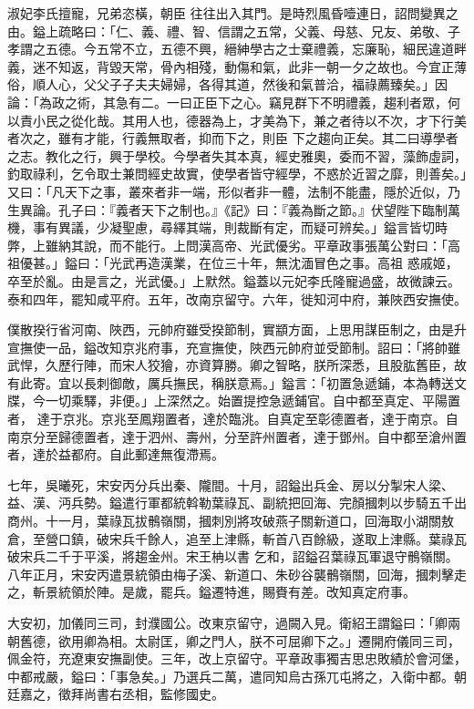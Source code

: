 \begin{pinyinscope}
 淑妃李氏擅寵，兄弟恣橫，朝臣
 往往出入其門。是時烈風昏噎連日，詔問變異之由。鎰上疏略曰：「仁、義、禮、智、信謂之五常，父義、母慈、兄友、弟敬、子孝謂之五德。今五常不立，五德不興，縉紳學古之士棄禮義，忘廉恥，細民違道畔義，迷不知返，背毀天常，骨內相殘，動傷和氣，此非一朝一夕之故也。今宜正薄俗，順人心，父父子子夫夫婦婦，各得其道，然後和氣普洽，福祿薦臻矣。」因論：「為政之術，其急有二。一曰正臣下之心。竊見群下不明禮義，趨利者眾，何以責小民之從化哉。其用人也，德器為上，才美為下，兼之者待以不次，才下行美者次之，雖有才能，行義無取者，抑而下之，則臣
 下之趨向正矣。其二曰導學者之志。教化之行，興于學校。今學者失其本真，經史雅奧，委而不習，藻飾虛詞，釣取祿利，乞令取士兼問經史故實，使學者皆守經學，不惑於近習之靡，則善矣。」又曰：「凡天下之事，叢來者非一端，形似者非一體，法制不能盡，隱於近似，乃生異論。孔子曰：『義者天下之制也。』《記》曰：『義為斷之節。』伏望陛下臨制萬機，事有異議，少凝聖慮，尋繹其端，則裁斷有定，而疑可辨矣。」鎰言皆切時弊，上雖納其說，而不能行。上問漢高帝、光武優劣。平章政事張萬公對曰：「高祖優甚。」鎰曰：「光武再造漢業，在位三十年，無沈湎冒色之事。高祖
 惑戚姬，卒至於亂。由是言之，光武優。」上默然。鎰蓋以元妃李氏隆寵過盛，故微諫云。泰和四年，罷知咸平府。五年，改南京留守。六年，徙知河中府，兼陜西安撫使。



 僕散揆行省河南、陜西，元帥府雖受揆節制，實顓方面，上思用謀臣制之，由是升宣撫使一品，鎰改知京兆府事，充宣撫使，陜西元帥府並受節制。詔曰：「將帥雖武悍，久歷行陣，而宋人狡獪，亦資算勝。卿之智略，朕所深悉，且股肱舊臣，故有此寄。宜以長刺御敵，厲兵撫民，稱朕意焉。」鎰言：「初置急遞鋪，本為轉送文牒，今一切乘驛，非便。」上深然之。始置提控急遞鋪官。自中都至真定、平陽置者，
 達于京兆。京兆至鳳翔置者，達於臨洮。自真定至彰德置者，達于南京。自南京分至歸德置者，達于泗州、壽州，分至許州置者，達于鄧州。自中都至滄州置者，達於益都府。自此郵達無復滯焉。



 七年，吳曦死，宋安丙分兵出秦、隴間。十月，詔鎰出兵金、房以分掣宋人梁、益、漢、沔兵勢。鎰遣行軍都統斡勒葉祿瓦、副統把回海、完顏摑刺以步騎五千出商州。十一月，葉祿瓦拔鶻嶺關，摑刺別將攻破燕子關新道口，回海取小湖關敖倉，至營口鎮，破宋兵千餘人，追至上津縣，斬首八百餘級，遂取上津縣。葉祿瓦破宋兵二千于平溪，將趨金州。宋王柟以書
 乞和，詔鎰召葉祿瓦軍退守鶻嶺關。八年正月，宋安丙遣景統領由梅子溪、新道口、朱砂谷襲鶻嶺關，回海，摑刺擊走之，斬景統領於陣。是歲，罷兵。鎰遷特進，賜賚有差。改知真定府事。



 大安初，加儀同三司，封濮國公。改東京留守，過闕入見。衛紹王謂鎰曰：「卿兩朝舊德，欲用卿為相。太尉匡，卿之門人，朕不可屈卿下之。」遷開府儀同三司，佩金符，充遼東安撫副使。三年，改上京留守。平章政事獨吉思忠敗績於會河堡，中都戒嚴，鎰曰：「事急矣。」乃選兵二萬，遣同知烏古孫兀屯將之，入衛中都。朝廷嘉之，徵拜尚書右丞相，監修國史。




\end{pinyinscope}
